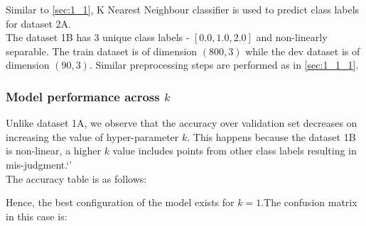 \documentclass[11pt,a4paper]{article}
\newcommand{\noi}{\noindent}
\begin{document}
Similar to \autoref{sec:1_1}, K Nearest Neighbour classifier is used to predict class labels for dataset 2A. \\

\noi
The dataset 1B has 3 unique class labels - $[0.0, 1.0, 2.0]$ and non-linearly separable. The train dataset is of dimension $(800,3)$ while the dev dataset is of dimension $(90,3)$. Similar preprocessing steps are performed as in \autoref{sec:1_1_1}.

\subsubsection{Model performance across $k$}
Unlike dataset 1A, we observe that the accuracy over validation set decreases on increasing the value of hyper-parameter $k$. This happens because the dataset 1B is non-linear, a higher $k$ value includes points from other class labels resulting in mis-judgment.`'\\

\noi
The accuracy table is as follows:


\noi 
Hence, the best configuration of the model exists for $k=1$.The confusion matrix in this case is:
\end{document}
